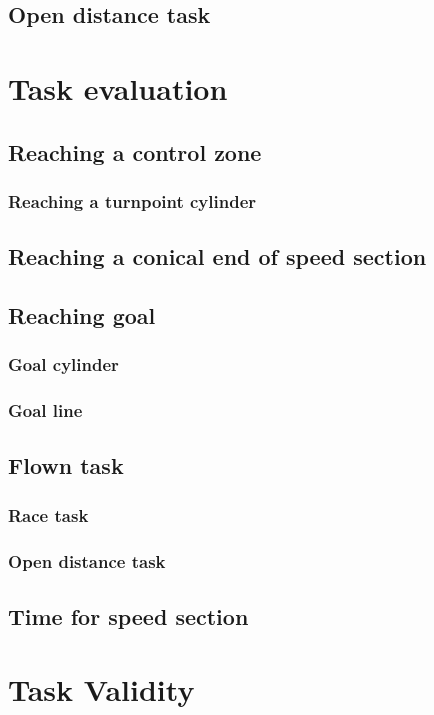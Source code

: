 \documentclass{article}
\begin{document}
\subsection{Open distance task}

\newpage
\section{Task evaluation}
\subsection{Reaching a control zone}
\subsubsection{Reaching a turnpoint cylinder}
\subsection{Reaching a conical end of speed section}
\subsection{Reaching goal}
\subsubsection{Goal cylinder}
\subsubsection{Goal line}
\subsection{Flown task}
\subsubsection{Race task}
\subsubsection{Open distance task}
\subsection{Time for speed section}

\newpage
\section{Task Validity}
\end{document}
